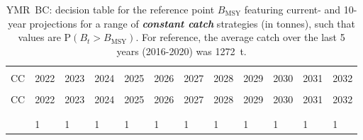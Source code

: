 \documentclass[11pt]{book}
\newcommand{\Bmsy}{B_\mathrm{MSY}}
\newcommand{\itbf}[1]{\textit{\textbf{#1}}}
\begin{document}
\begin{longtable}[c]{>{\raggedright\let\newline\\\arraybackslash\hspace{0pt}}p{0.49in}>{\raggedleft\let\newline\\\arraybackslash\hspace{0pt}}p{0.49in}>{\raggedleft\let\newline\\\arraybackslash\hspace{0pt}}p{0.5in}>{\raggedleft\let\newline\\\arraybackslash\hspace{0pt}}p{0.5in}>{\raggedleft\let\newline\\\arraybackslash\hspace{0pt}}p{0.5in}>{\raggedleft\let\newline\\\arraybackslash\hspace{0pt}}p{0.5in}>{\raggedleft\let\newline\\\arraybackslash\hspace{0pt}}p{0.5in}>{\raggedleft\let\newline\\\arraybackslash\hspace{0pt}}p{0.5in}>{\raggedleft\let\newline\\\arraybackslash\hspace{0pt}}p{0.5in}>{\raggedleft\let\newline\\\arraybackslash\hspace{0pt}}p{0.5in}>{\raggedleft\let\newline\\\arraybackslash\hspace{0pt}}p{0.5in}>{\raggedleft\let\newline\\\arraybackslash\hspace{0pt}}p{0.5in}}
  \caption{YMR~BC: decision table for the reference point $\Bmsy$ featuring current- and 10-year projections for a range of \itbf{constant catch} strategies (in tonnes), such that values are P$(B_t > \Bmsy)$.  For reference, the average catch over the last 5 years (2016-2020) was 1272~t. } \label{tab:ymr.gmu.Bmsy.CCs}\\  \hline\\[-2.2ex]  CC  & 2022 & 2023 & 2024 & 2025 & 2026 & 2027 & 2028 & 2029 & 2030 & 2031 & 2032 \\[0.2ex]\hline\\[-1.5ex]  \endfirsthead   \hline  CC  & 2022 & 2023 & 2024 & 2025 & 2026 & 2027 & 2028 & 2029 & 2030 & 2031 & 2032 \\[0.2ex]\hline\\[-1.5ex]  \endhead  \hline\\[-2.2ex]   \endfoot  \hline \endlastfoot  0 & 1 & 1 & 1 & 1 & 1 & 1 & 1 & 1 & 1 & 1 & 1 \\ 

\end{longtable}
\end{document}
